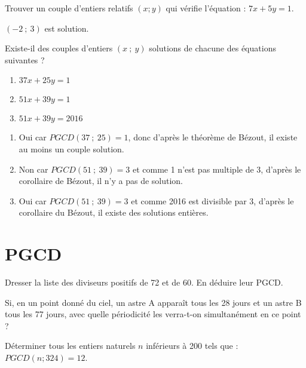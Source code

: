 \documentclass{cornouaille}
\begin{document}
\begin{exercice}
  Trouver un couple d'entiers relatifs $(x ; y)$ qui vérifie
  l'équation : $7x+5y=1$.
\end{exercice}
\begin{solution}
  $(-2\ ;\ 3)$ est solution.
\end{solution}

\begin{exercice}
  Existe-il des couples d'entiers $(x\ ;\ y)$ solutions de chacune des
  équations suivantes ?
\begin{enumerate}
\item $37x + 25y = 1$
\item $51x + 39y = 1$
\item $51x + 39y = 2016$
\end{enumerate}
\end{exercice}
\begin{solution}
  \begin{enumerate}
  \item Oui car $PGCD(37\ ;\ 25)=1$, donc d'après le théorème de
    Bézout, il existe au moins un couple solution.
  \item Non car $PGCD(51\ ;\ 39)=3$ et comme 1 n'est pas multiple de
    3, d'après le corollaire de Bézout, il n'y a pas de solution.
  \item Oui car $PGCD(51\ ;\ 39)=3$ et comme 2016 est divisible par
    3, d'après le corollaire du Bézout, il existe des solutions
    entières.
\end{enumerate}
\end{solution}
\section{PGCD}

\begin{exercice}
Dresser la liste des diviseurs positifs de 72 et de 60. En déduire leur PGCD.
\end{exercice}

\begin{exercice}
Si, en un point donné du ciel, un astre A apparaît tous les 28 jours et un astre B tous les 77 jours, avec quelle périodicité les verra-t-on simultanément en ce point ?
\end{exercice}

\begin{exercice}
Déterminer tous les entiers naturels $n$ inférieurs à 200 tels que : $PGCD(n;324)=12$.
\end{exercice}
\end{document}
